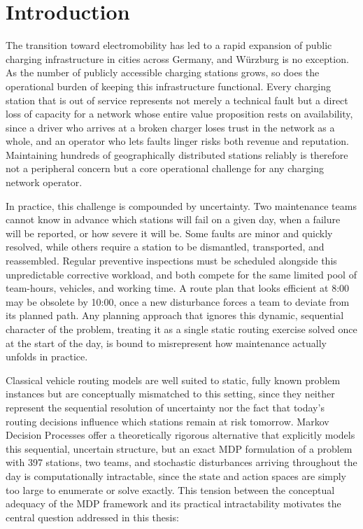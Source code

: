 \documentclass[12pt,oneside]{article}
\begin{document}

\section{Introduction} \label{einleitung}

The transition toward electromobility has led to a rapid expansion of public charging infrastructure in cities across Germany, and Würzburg is no exception. As the number of publicly accessible charging stations grows, so does the operational burden of keeping this infrastructure functional. Every charging station that is out of service represents not merely a technical fault but a direct loss of capacity for a network whose entire value proposition rests on availability, since a driver who arrives at a broken charger loses trust in the network as a whole, and an operator who lets faults linger risks both revenue and reputation. Maintaining hundreds of geographically distributed stations reliably is therefore not a peripheral concern but a core operational challenge for any charging network operator.

In practice, this challenge is compounded by uncertainty. Two maintenance teams cannot know in advance which stations will fail on a given day, when a failure will be reported, or how severe it will be. Some faults are minor and quickly resolved, while others require a station to be dismantled, transported, and reassembled. Regular preventive inspections must be scheduled alongside this unpredictable corrective workload, and both compete for the same limited pool of team-hours, vehicles, and working time. A route plan that looks efficient at 8:00 may be obsolete by 10:00, once a new disturbance forces a team to deviate from its planned path. Any planning approach that ignores this dynamic, sequential character of the problem, treating it as a single static routing exercise solved once at the start of the day, is bound to misrepresent how maintenance actually unfolds in practice.

Classical vehicle routing models are well suited to static, fully known problem instances but are conceptually mismatched to this setting, since they neither represent the sequential resolution of uncertainty nor the fact that today's routing decisions influence which stations remain at risk tomorrow. Markov Decision Processes offer a theoretically rigorous alternative that explicitly models this sequential, uncertain structure, but an exact MDP formulation of a problem with 397 stations, two teams, and stochastic disturbances arriving throughout the day is computationally intractable, since the state and action spaces are simply too large to enumerate or solve exactly. This tension between the conceptual adequacy of the MDP framework and its practical intractability motivates the central question addressed in this thesis:
\end{document}
